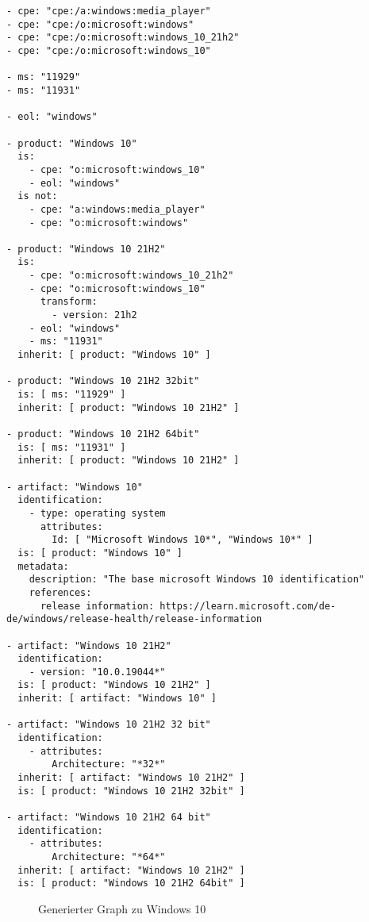 \begin{lstlisting}[style=yaml,caption={Produktmodellierung zu Windows 10},label={lst:new-correlation-windows},basicstyle=\ttfamily\scriptsize]
- cpe: "cpe:/a:windows:media_player"
- cpe: "cpe:/o:microsoft:windows"
- cpe: "cpe:/o:microsoft:windows_10_21h2"
- cpe: "cpe:/o:microsoft:windows_10"

- ms: "11929"
- ms: "11931"

- eol: "windows"

- product: "Windows 10"
  is:
    - cpe: "o:microsoft:windows_10"
    - eol: "windows"
  is not:
    - cpe: "a:windows:media_player"
    - cpe: "o:microsoft:windows"

- product: "Windows 10 21H2"
  is:
    - cpe: "o:microsoft:windows_10_21h2"
    - cpe: "o:microsoft:windows_10"
      transform:
        - version: 21h2
    - eol: "windows"
    - ms: "11931"
  inherit: [ product: "Windows 10" ]

- product: "Windows 10 21H2 32bit"
  is: [ ms: "11929" ]
  inherit: [ product: "Windows 10 21H2" ]

- product: "Windows 10 21H2 64bit"
  is: [ ms: "11931" ]
  inherit: [ product: "Windows 10 21H2" ]

- artifact: "Windows 10"
  identification:
    - type: operating system
      attributes:
        Id: [ "Microsoft Windows 10*", "Windows 10*" ]
  is: [ product: "Windows 10" ]
  metadata:
    description: "The base microsoft Windows 10 identification"
    references:
      release information: https://learn.microsoft.com/de-de/windows/release-health/release-information

- artifact: "Windows 10 21H2"
  identification:
    - version: "10.0.19044*"
  is: [ product: "Windows 10 21H2" ]
  inherit: [ artifact: "Windows 10" ]

- artifact: "Windows 10 21H2 32 bit"
  identification:
    - attributes:
        Architecture: "*32*"
  inherit: [ artifact: "Windows 10 21H2" ]
  is: [ product: "Windows 10 21H2 32bit" ]

- artifact: "Windows 10 21H2 64 bit"
  identification:
    - attributes:
        Architecture: "*64*"
  inherit: [ artifact: "Windows 10 21H2" ]
  is: [ product: "Windows 10 21H2 64bit" ]
\end{lstlisting}

\begin{figure}[htbp]
    \centering
    \makebox[\textwidth]{}
    \caption{Generierter Graph zu Windows 10}
    \label{fig:example-graph-windows}
\end{figure}
